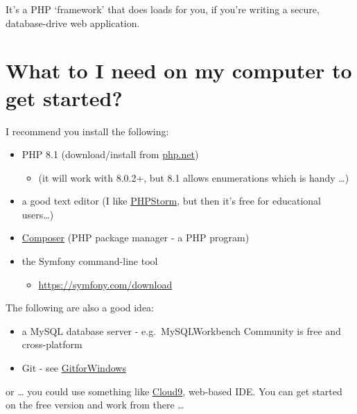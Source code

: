 \documentclass[a4paperpaper,openright]{book}
\providecommand{\tightlist}{%
  \setlength{\itemsep}{0pt}\setlength{\parskip}{0pt}}
\begin{document}
It's a PHP `framework' that does loads for you, if you're writing a
secure, database-drive web application.

\hypertarget{what-to-i-need-on-my-computer-to-get-started}{%
\section{What to I need on my computer to get
started?}\label{what-to-i-need-on-my-computer-to-get-started}}

I recommend you install the following:

\begin{itemize}
\item
  PHP 8.1 (download/install from \href{https://php.net/}{php.net})

  \begin{itemize}
  \tightlist
  \item
    (it will work with 8.0.2+, but 8.1 allows enumerations which is
    handy \ldots{})
  \end{itemize}
\item
  a good text editor (I like
  \href{https://www.jetbrains.com/phpstorm/specials/phpstorm/phpstorm.html?\&gclid=CJTK_8SDrtICFWq-7Qodh98NpQ\&gclsrc=aw.ds.ds\&dclid=CNPY28WDrtICFQGn7QodqekBWg}{PHPStorm},
  but then it's free for educational users\ldots{})
\item
  \href{https://getcomposer.org/}{Composer} (PHP package manager - a PHP
  program)
\item
  the Symfony command-line tool

  \begin{itemize}
  \tightlist
  \item
    \url{https://symfony.com/download}
  \end{itemize}
\end{itemize}

The following are also a good idea:

\begin{itemize}
\item
  a MySQL database server - e.g.~MySQLWorkbench Community is free and
  cross-platform
\item
  Git - see \href{https://git-scm.com/download/win}{GitforWindows}
\end{itemize}

or \ldots{} you could use something like
\href{https://c9.io/dr_matt_smith}{Cloud9}, web-based IDE. You can get
started on the free version and work from there \ldots{}
\end{document}
